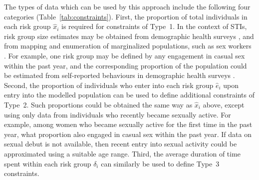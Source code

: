 \par
The types of data which can be used by this approach include the following four categories
(Table~\ref{tab:constraints}).
First, the proportion of total individuals in each risk group $\hat{x}_i$ is required
for constraints of Type~1.
In the context of STIs, risk group size estimates may be obtained from
demographic health surveys \citep{DHS}, and from
mapping and enumeration of marginalized populations,
such as sex workers \citep{Abdul-Quader2014}.
For example, one risk group may be defined by
any engagement in casual sex within the past year,
and the corresponding proportion of the population
could be estimated from self-reported behaviours
in demographic health surveys \citep{DHS}.
Second, the proportion of individuals who enter into each risk group $\hat{e}_i$
upon entry into the modelled population can be used to define additional constraints of Type~2.
Such proportions could be obtained the same way as $\hat{x}_i$ above,
except using only data from individuals who recently became sexually active.
For example, among women who became sexually active for the first time in the past year,
what proportion also engaged in casual sex within the past year.
If data on sexual debut is not available,
then recent entry into sexual activity could be approximated using
a suitable age range.
Third, the average duration of time spent within each risk group $\delta_i$
can similarly be used to define Type~3 constraints.
